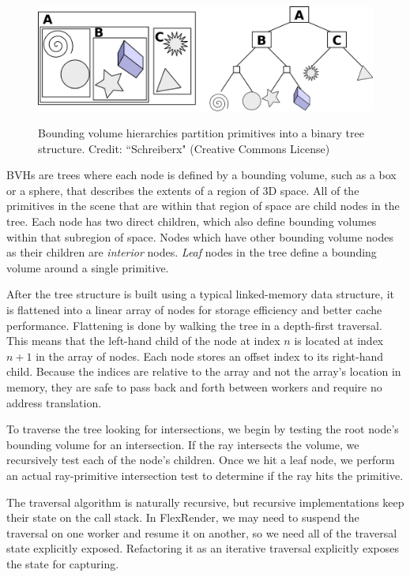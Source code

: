 \documentclass[12pt]{ucthesis}
\newcommand{\captionfonts}{\small\bf\ssp}
\begin{document}
\begin{figure}[h!]
    \centering
    \includegraphics[width=140mm]{figures/bvh.png}
    \captionfonts
    \caption{Bounding volume hierarchies partition primitives into a binary tree structure. Credit: ``Schreiberx" (Creative Commons License)}
    \label{fig:bvh}
\end{figure}

BVHs are trees where each node is defined by a bounding volume, such as a box
or a sphere, that describes the extents of a region of 3D space. All of the
primitives in the scene that are within that region of space are child nodes
in the tree. Each node has two direct children, which also define bounding
volumes within that subregion of space. Nodes which have other bounding volume
nodes as their children are \emph{interior} nodes. \emph{Leaf} nodes in the tree
define a bounding volume around a single primitive.

After the tree structure is built using a typical linked-memory data structure,
it is flattened into a linear array of nodes for storage efficiency and better
cache performance. Flattening is done by walking the tree in a depth-first
traversal. This means that the left-hand child of the node at index $n$ is
located at index $n + 1$ in the array of nodes. Each node stores an offset
index to its right-hand child. Because the indices are relative to the array
and not the array's location in memory, they are safe to pass back and forth
between workers and require no address translation.

To traverse the tree looking for intersections, we begin by testing the root
node's bounding volume for an intersection. If the ray intersects the volume,
we recursively test each of the node's children. Once we hit a leaf node,
we perform an actual ray-primitive intersection test to determine if the ray
hits the primitive.

The traversal algorithm is naturally recursive, but recursive implementations
keep their state on the call stack. In FlexRender, we may need to suspend the
traversal on one worker and resume it on another, so we need all of the
traversal state explicitly exposed. Refactoring it as an iterative traversal
explicitly exposes the state for capturing.
\end{document}
